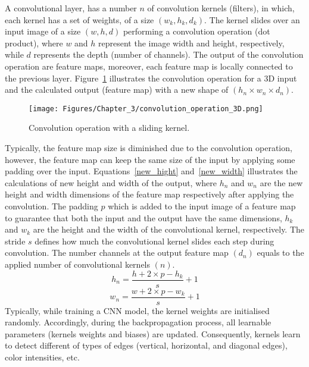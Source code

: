 A convolutional layer, has a number \( n\) of convolution kernels (filters), in  which,  each kernel has a set of weights, of a size \((w_k,h_k,d_k)\).
The kernel slides over an input image of a size \((w,h,d)\) performing a convolution operation (dot product), where \(w\) and \(h\) represent the image width and height, respectively, while \(d\) represents the depth (number of channels).
The output of the convolution operation are feature maps, moreover, each feature map is locally connected to the previous layer. 
Figure~\ref{fig:convolution_3d} illustrates the convolution operation for a 3D input and the calculated output (feature map) with a new shape of \((h_{n}\times w_{n} \times d_{n})\).
\begin{figure} [!ht]
	\begin{center}
		\centering
		\texttt{[image: Figures/Chapter\_3/convolution\_operation\_3D.png]}
	\end{center}
	\caption{Convolution operation with a sliding kernel.} 
	\label{fig:convolution_3d}
\end{figure}

Typically, the feature map size is diminished due to the convolution operation, however, the feature map can keep the same size of the input by applying some padding over the input. 
Equations~\ref{new_hight} and~\ref{new_width} illustrates the calculations of new height and width of the output, where \(h_{n}\) and \(w_{n}\) are the new height and width dimensions of the feature map respectively after applying the convolution. 
The padding \(p\) which is added to the input image of a feature map to guarantee that both the input and the output have the same dimensions, \(h_{k}\) and \(w_{k}\) are the height and the width of the convolutional kernel, respectively.
The stride \(s\) defines how much the convolutional kernel slides each step during convolution.
The number channels at the output feature map \((d_{n})\) equals to the applied number of convolutional kernels \((n)\). 
\begin{equation}
	h_{n} = \frac{h+2\times p-h_{k}}{s}+1  
	\label{new_hight}
\end{equation}
\begin{equation}
	w_{n} = \frac{w+2\times p-w_{k}}{s}+1
	\label{new_width}
\end{equation}
Typically,  while training a CNN model, the kernel weights are initialised randomly.
Accordingly, during the backpropagation process, all learnable parameters (kernels weights and biases) are updated.
Consequently, kernels learn to detect different of types of edges (vertical, horizontal, and diagonal edges), color intensities, etc.

